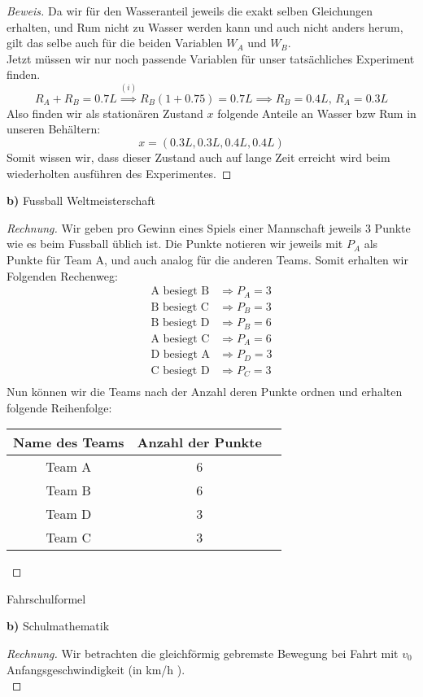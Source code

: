 \documentclass[a4paper]{article}
\newenvironment{Aufgabe}[2][Aufgabe]{\begin{trivlist}
\item[\hskip \labelsep {\bfseries #1}\hskip \labelsep {\bfseries #2.}]}{\end{trivlist}}
\begin{document}
\begin{theorem}
\begin{proof}[Beweis]
	Da wir für den Wasseranteil jeweils die exakt selben
	Gleichungen erhalten, und Rum nicht zu Wasser werden kann
	und auch nicht anders herum, gilt das selbe auch für 
	die beiden Variablen $W_A$ und $W_B$.
	\\

	Jetzt müssen wir nur noch passende Variablen für 
	unser tatsächliches Experiment finden.
	\[
	R_A + R_B = 0.7 L
	\overset{(i)} \implies R_B \left(
		1 + 0.75
	\right) = 0.7 L
	\implies 
	R_B = 0.4L, \,
	R_A = 0.3L
	\] 
	Also finden wir als stationären Zustand $x$ folgende Anteile
	an Wasser bzw Rum in unseren Behältern:
	\[
	x = \left(
		0.3 L, 0.3 L, 0.4 L, 0.4 L
	\right) 
	\] 
	Somit wissen wir, dass dieser Zustand auch auf lange Zeit
	erreicht wird beim wiederholten ausführen des Experimentes.
\end{proof}
\end{theorem}

\textbf{b)} Fussball Weltmeisterschaft

\begin{proof}[Rechnung]
	Wir geben pro Gewinn eines Spiels einer Mannschaft jeweils
	3 Punkte wie es beim Fussball üblich ist.
	Die Punkte notieren wir jeweils mit $P_A$ als Punkte für 
	Team A, und auch analog für die anderen Teams.
	Somit erhalten wir Folgenden Rechenweg:
	\begin{align*}
		\text{A besiegt B} & \Rightarrow P_A = 3 \\
		\text{B besiegt C} & \Rightarrow P_B = 3 \\
		\text{B besiegt D} & \Rightarrow P_B = 6 \\
		\text{A besiegt C} & \Rightarrow P_A = 6 \\
		\text{D besiegt A} & \Rightarrow P_D = 3 \\
		\text{C besiegt D} & \Rightarrow P_C = 3 \\
	\end{align*}
	Nun können wir die Teams nach der Anzahl deren Punkte ordnen
	und erhalten folgende Reihenfolge:
	\begin{center}
	\begin{tabular}{ |c|c|c| } 
	 \hline
	 Name des Teams & Anzahl der Punkte \\ 
	 \hline
	 Team A & 6 \\ 
	 Team B & 6 \\ 
	 Team D & 3 \\ 
	 Team C & 3 \\ 
	 \hline
	\end{tabular}
\end{center}
\end{proof}

\begin{theorem} %
\begin{Aufgabe}{30} %
	Fahrschulformel
\end{Aufgabe}

\textbf{b)} Schulmathematik

\begin{proof}[Rechnung]
	Wir betrachten die gleichförmig gebremste Bewegung bei
	Fahrt mit $v_0$ Anfangsgeschwindigkeit (in km/h ).
	\[
	
	\] 
\end{proof}
\end{theorem}
\end{document}
